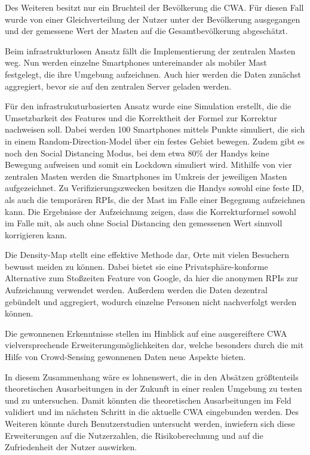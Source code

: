 \documentclass[conference,compsoc]{IEEEtran}
\begin{document}
Des Weiteren besitzt nur ein Bruchteil der Bevölkerung die CWA. Für diesen Fall wurde von einer Gleichverteilung der Nutzer unter der Bevölkerung ausgegangen und der gemessene Wert der Masten auf die Gesamtbevölkerung abgeschätzt.

Beim infrastrukturlosen Ansatz fällt die Implementierung der zentralen Masten weg. 
Nun werden einzelne Smartphones untereinander als mobiler Mast festgelegt, die ihre Umgebung aufzeichnen.
Auch hier werden die Daten zunächst aggregiert, bevor sie auf den zentralen Server geladen werden.

Für den infrastrukuturbasierten Ansatz wurde eine Simulation erstellt, die die Umsetzbarkeit des Features und die Korrektheit der Formel zur Korrektur nachweisen soll. 
Dabei werden 100 Smartphones mittels Punkte simuliert, die sich in einem Random-Direction-Model über ein festes Gebiet bewegen. 
Zudem gibt es noch den \glqq Social Distancing \grqq{} Modus, bei dem etwa 80\% der Handys keine Bewegung aufweisen und somit ein Lockdown simuliert wird.
Mithilfe von vier zentralen Masten werden die Smartphones im Umkreis der jeweiligen Masten aufgezeichnet. 
Zu Verifizierungszwecken besitzen die Handys sowohl eine feste ID, als auch die temporären RPIs, die der Mast im Falle einer Begegnung aufzeichnen kann. 
Die Ergebnisse der Aufzeichnung zeigen, dass die Korrekturformel sowohl im Falle mit, als auch ohne Social Distancing den gemessenen Wert sinnvoll korrigieren kann. 

Die Density-Map stellt eine effektive Methode dar, Orte mit vielen Besuchern bewusst meiden zu können.
Dabei bietet sie eine Privatsphäre-konforme Alternative zum Stoßzeiten Feature von Google, da hier die anonymen RPIs zur Aufzeichnung verwendet werden. 
Außerdem werden die Daten dezentral gebündelt und aggregiert, wodurch einzelne Personen nicht nachverfolgt werden können. 

Die gewonnenen Erkenntnisse stellen im Hinblick auf eine ausgereiftere CWA vielversprechende Erweiterungsmöglichkeiten dar, welche besonders durch die mit Hilfe von Crowd-Sensing gewonnenen Daten neue Aspekte bieten.

In diesem Zusammenhang wäre es lohnenswert, die in den Absätzen größtenteils theoretischen Ausarbeitungen in der Zukunft in einer realen Umgebung zu testen und zu untersuchen. 
Damit könnten die theoretischen Ausarbeitungen im Feld validiert und im nächsten Schritt in die aktuelle CWA eingebunden werden.
Des Weiteren könnte durch Benutzerstudien untersucht werden, inwiefern sich diese Erweiterungen auf die Nutzerzahlen, die Risikoberechnung und auf die Zufriedenheit der Nutzer auswirken. 
\end{document}
